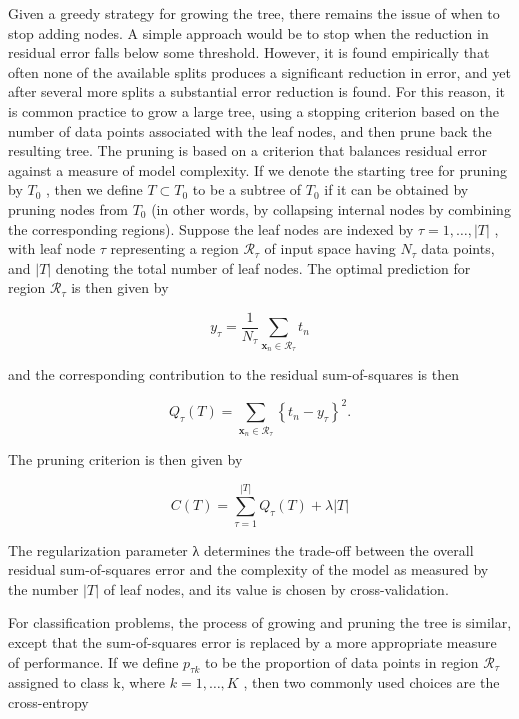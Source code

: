 \documentclass[
  10
]{article}
\begin{document}
Given a greedy strategy for growing the tree, there remains the issue of
when to stop adding nodes. A simple approach would be to stop when the
reduction in residual error falls below some threshold. However, it is
found empirically that often none of the available splits produces a
significant reduction in error, and yet after several more splits a
substantial error reduction is found. For this reason, it is common
practice to grow a large tree, using a stopping criterion based on the
number of data points associated with the leaf nodes, and then prune
back the resulting tree. The pruning is based on a criterion that
balances residual error against a measure of model complexity. If we
denote the starting tree for pruning by \(T _ { 0 }\) , then we define
\(T \subset T _ { 0 }\) to be a subtree of \(T _ { 0 }\) if it can be
obtained by pruning nodes from \(T _ { 0 }\) (in other words, by
collapsing internal nodes by combining the corresponding regions).
Suppose the leaf nodes are indexed by \(\tau = 1 , \dots , | T |\) ,
with leaf node \(\tau\) representing a region
\(\mathcal { R } _ { \tau }\) of input space having \(N _ { \tau }\)
data points, and \(| T |\) denoting the total number of leaf nodes. The
optimal prediction for region \(\mathcal { R } _ { \tau }\) is then
given by

\[
y _ {\tau} = \frac {1}{N _ {\tau}} \sum_ {\mathbf {x} _ {n} \in \mathcal {R} _ {\tau}} t _ {n}\tag{14.29}
\]

and the corresponding contribution to the residual sum-of-squares is
then

\[
Q _ {\tau} (T) = \sum_ {\mathbf {x} _ {n} \in \mathcal {R} _ {\tau}} \left\{t _ {n} - y _ {\tau} \right\} ^ {2}.\tag{14.30}
\]

The pruning criterion is then given by

\[
C (T) = \sum_ {\tau = 1} ^ {| T |} Q _ {\tau} (T) + \lambda | T |\tag{14.31}
\]

The regularization parameter λ determines the trade-off between the
overall residual sum-of-squares error and the complexity of the model as
measured by the number \(| T |\) of leaf nodes, and its value is chosen
by cross-validation.

For classification problems, the process of growing and pruning the tree
is similar, except that the sum-of-squares error is replaced by a more
appropriate measure of performance. If we define \(p _ { \tau k }\) to
be the proportion of data points in region \(\mathcal { R } _ { \tau }\)
assigned to class k, where \(k = 1 , \ldots , K\) , then two commonly
used choices are the cross-entropy
\end{document}
